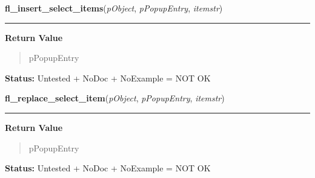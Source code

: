     \label{xformslib:library:fl_insert_select_items}

    \vspace{0.5ex}

\hspace{.8\funcindent}\begin{boxedminipage}{\funcwidth}

    \raggedright \textbf{fl\_insert\_select\_items}(\textit{pObject}, \textit{pPopupEntry}, \textit{itemstr})

    \vspace{-1.5ex}

    \rule{\textwidth}{0.5\fboxrule}
\setlength{\parskip}{2ex}
\setlength{\parskip}{1ex}
      \textbf{Return Value}
    \vspace{-1ex}

      \begin{quote}
      pPopupEntry

      \end{quote}

\textbf{Status:} Untested + NoDoc + NoExample = NOT OK



    \end{boxedminipage}

    \label{xformslib:library:fl_replace_select_item}

    \vspace{0.5ex}

\hspace{.8\funcindent}\begin{boxedminipage}{\funcwidth}

    \raggedright \textbf{fl\_replace\_select\_item}(\textit{pObject}, \textit{pPopupEntry}, \textit{itemstr})

    \vspace{-1.5ex}

    \rule{\textwidth}{0.5\fboxrule}
\setlength{\parskip}{2ex}
\setlength{\parskip}{1ex}
      \textbf{Return Value}
    \vspace{-1ex}

      \begin{quote}
      pPopupEntry

      \end{quote}

\textbf{Status:} Untested + NoDoc + NoExample = NOT OK



    \end{boxedminipage}

